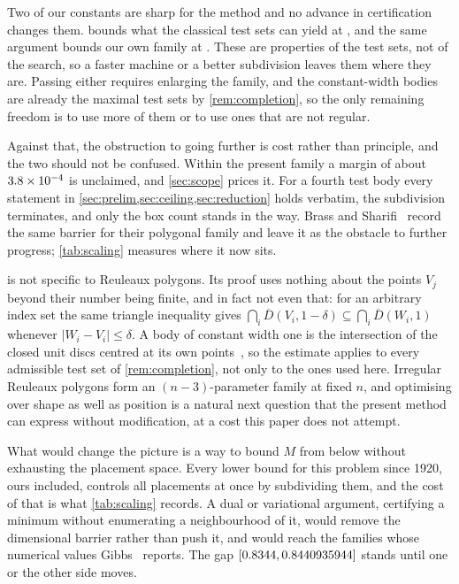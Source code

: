 \documentclass[a4paper,UKenglish,cleveref,autoref,thm-restate,numberwithinsect]{lipics-v2021}
\begin{document}
Two of our constants are sharp for the method and no advance in certification
changes them.  bounds what the classical test sets can yield at
\ClassicalCeilingSafe{}, and the same argument bounds our own family at
\FamilyBCeilingSafe{}. These are properties of the test sets, not of the search,
so a faster machine or a better subdivision leaves them where they are. Passing
either requires enlarging the family, and the constant-width bodies are already
the maximal test sets by \cref{rem:completion}, so the only remaining freedom is
to use more of them or to use ones that are not regular.

Against that, the obstruction to going further is cost rather than principle, and
the two should not be confused. Within the present family a margin of about
$3.8\times10^{-4}$ is unclaimed, and \cref{sec:scope} prices it. For a fourth
test body every statement in \cref{sec:prelim,sec:ceiling,sec:reduction} holds
verbatim, the subdivision terminates, and only the box count stands in the way.
Brass and Sharifi~\cite{BrassSharifi2005} record the same barrier for their
polygonal family and leave it as the obstacle to further progress;
\cref{tab:scaling} measures where it now sits.

 is not specific to Reuleaux polygons. Its proof uses nothing
about the points $V_j$ beyond their number being finite, and in fact not even
that: for an arbitrary index set the same triangle inequality gives
$\bigcap_{i}\overline{D}(V_i,1-\delta)\subseteq\bigcap_i\overline{D}(W_i,1)$
whenever $|W_i-V_i|\le\delta$. A body of constant width one is the intersection of
the closed unit discs centred at its own points~\cite{Grunbaum1963}, so the
estimate applies to every admissible test set of \cref{rem:completion}, not only
to the ones used here. Irregular Reuleaux polygons form an $(n-3)$-parameter
family at fixed $n$, and optimising over shape as well as position is a natural
next question that the present method can express without modification, at a cost
this paper does not attempt.

What would change the picture is a way to bound $M$ from below without exhausting
the placement space. Every lower bound for this problem since 1920, ours included,
controls all placements at once by subdividing them, and the cost of that is what
\cref{tab:scaling} records. A dual or variational argument,
certifying a minimum without enumerating a neighbourhood of it, would remove the
dimensional barrier rather than push it, and would reach the families whose
numerical values Gibbs~\cite{Gibbs2014} reports. The gap
$[0.8344,0.8440935944]$ stands until one or the other side moves.


\end{document}
